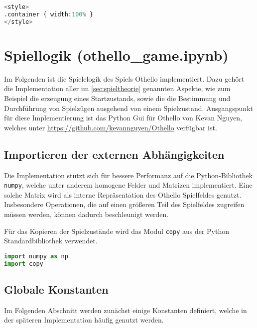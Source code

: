 \begin{lstlisting}[language=Python]
%%HTML
<style>
.container { width:100% }
</style>
\end{lstlisting}

\hypertarget{spiellogik-othello_game.ipynb}{%
\section{Spiellogik
(othello\_game.ipynb)}\label{spiellogik-othello_game.ipynb}}

\label{sec:gamelogic} Im Folgenden ist die Spielelogik des Spiels
Othello implementiert. Dazu gehört die Implementation aller im
\autoref{sec:spieltheorie} genannten Aspekte, wie zum Beispiel die
erzeugung eines Startzustands, sowie die die Bestimmung und Durchführung
von Spielzügen ausgehend von einem Spielzustand. Ausgangspunkt für diese
Implementierung ist das Python Gui für Othello von Kevan Nguyen, welches
unter \url{https://github.com/kevannguyen/Othello} verfügbar ist.

\hypertarget{importieren-der-externen-abhuxe4ngigkeiten}{%
\subsection{Importieren der externen
Abhängigkeiten}\label{importieren-der-externen-abhuxe4ngigkeiten}}

Die Implementation stützt sich für bessere Performanz auf die
Python-Bibliothek \passthrough{\lstinline!numpy!}, welche unter anderem
homogene Felder und Matrizen implementiert. Eine solche Matrix wird als
interne Repräsentation des Othello Spielfeldes genutzt. Insbesondere
Operationen, die auf einen größeren Teil des Spielfeldes zugreifen
müssen werden, können dadurch beschleunigt werden.

Für das Kopieren der Spielzustände wird das Modul
\passthrough{\lstinline!copy!} aus der Python Standardbibliothek
verwendet.

\begin{lstlisting}[language=Python]
import numpy as np
import copy
\end{lstlisting}

\hypertarget{globale-konstanten}{%
\subsection{Globale Konstanten}\label{globale-konstanten}}

Im Folgenden Abschnitt werden zunächst einige Konstanten definiert,
welche in der späteren Implementation häufig genutzt werden.

